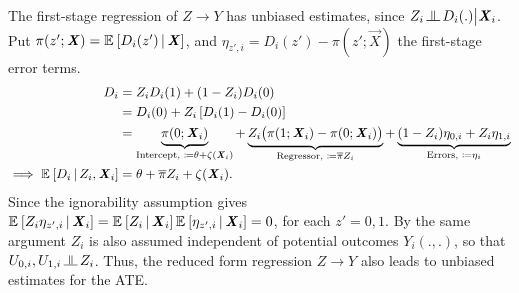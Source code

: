 The first-stage regression of $Z \to Y$ has unbiased estimates, since $Z_i \indep D_i(.) \big| \vec X_i$.
Put $\pi(z'; \boldsymbol{\mathit{X}}) = \mathbb{E}_{} \left[ D_i(z') \, \middle\vert \, \boldsymbol{\mathit{X}} \right]$, and $\eta_{z', i} = D_i(z') - \pi(z'; \vec X)$ the first-stage error terms.
\begin{align*}
    D_i &= Z_i D_i(1) + (1 - Z_i) D_i(0) \\
        &= D_i(0) +
            Z_i \left[ D_i(1) - D_i(0) \right] \\
        &= \underbrace{\pi(0; \boldsymbol{\mathit{X}}_i) 
        }_{\text{Intercept, } \coloneqq \theta + \zeta(\boldsymbol{\mathit{X}}_i)} +
            \underbrace{Z_i \big( \pi(1; \boldsymbol{\mathit{X}}_i) - \pi(0; \boldsymbol{\mathit{X}}_i) \big)}_{
                \text{Regressor, } \coloneqq \overline{\pi} Z_i }
        + \underbrace{(1- Z_i) \eta_{0,i} + Z_i \eta_{1,i}}_{
            \text{Errors, } \coloneqq \eta_i} \\
    \implies \mathbb{E}_{} \left[ D_i \, \middle\vert \, Z_i, \boldsymbol{\mathit{X}}_i \right]
        &= \theta + \overline{\pi} Z_i + \zeta(\boldsymbol{\mathit{X}}_i).
\end{align*}
Since the ignorability assumption gives $\mathbb{E}_{} \left[ Z_i \eta_{z',i} \, \middle\vert \, \boldsymbol{\mathit{X}}_i \right] = \mathbb{E}_{} \left[ Z_i \, \middle\vert \, \boldsymbol{\mathit{X}}_i \right] \mathbb{E}_{} \left[ \eta_{z',i} \, \middle\vert \, \boldsymbol{\mathit{X}}_i \right] = 0$, for each $z' =0,1$.
By the same argument $Z_i$ is also assumed independent of potential outcomes $Y_i(.,.)$, so that $U_{0,i}, U_{1,i} \indep Z_i$.
Thus, the reduced form regression $Z \to Y$ also leads to unbiased estimates for the ATE.

